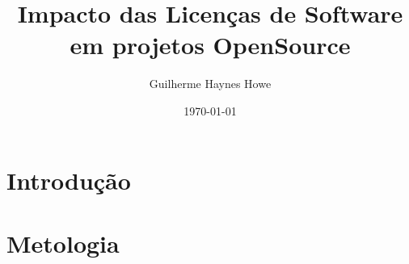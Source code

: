 \documentclass[..]{EstacioArtigo}
\begin{document}
    \title{Impacto das Licenças de Software em projetos OpenSource}
    \author{Guilherme Haynes Howe}
    \date{\today}

    \maketitle

    \makeresume{
        
    }


    \section{Introdução}
    

    \section{Metologia}
    

    
    
\end{document}
